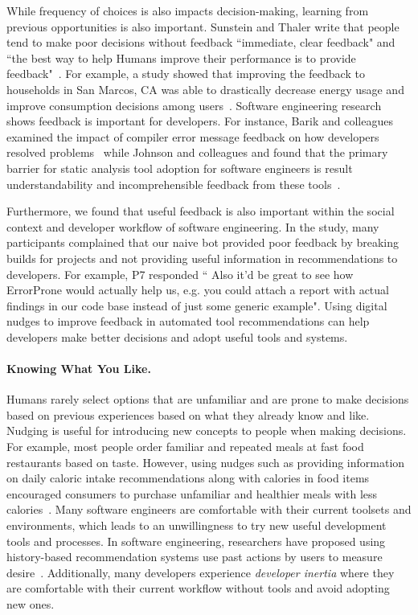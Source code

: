 While frequency of choices is also impacts decision-making, learning from previous opportunities is also important. Sunstein and Thaler write that people tend to make poor decisions without feedback ``immediate, clear feedback" and ``the best way to help Humans improve their performance is to provide feedback"~\cite[p.~77,~92]{sunstein2008nudge}. For example, a study showed that improving the feedback to households in San Marcos, CA was able to drastically decrease energy usage and improve consumption decisions among users~\cite{schultz2007constructive}. Software engineering research shows feedback is important for developers. For instance, Barik and colleagues examined the impact of compiler error message feedback on how developers resolved problems~\cite{barik2018should} while Johnson and colleagues and found that the primary barrier for static analysis tool adoption for software engineers is result understandability and incomprehensible feedback from these tools~\cite{Johnson2013Why}.

Furthermore, we found that useful feedback is also important within the social context and developer workflow of software engineering. In the \sorry study, many participants complained that our naive bot provided poor feedback by breaking builds for projects and not providing useful information in recommendations to developers. For example, P7 responded `` Also it'd be great to see how ErrorProne would actually help us, e.g. you could attach a report with actual findings in our code base instead of just some generic example". Using digital nudges to improve feedback in automated tool recommendations can help developers make better decisions and adopt useful tools and systems.

\paragraph{Knowing What You Like.} 

Humans rarely select options that are unfamiliar and are prone to make decisions based on previous experiences based on what they already know and like. Nudging is useful for introducing new concepts to people when making decisions. For example, most people order familiar and repeated meals at fast food restaurants based on taste. However, using nudges such as providing information on daily caloric intake recommendations along with calories in food items encouraged consumers to purchase unfamiliar and healthier meals with less calories~\cite{Wisdom2010Healthy}. Many software engineers are comfortable with their current toolsets and environments, which leads to an unwillingness to try new useful development tools and processes. In software engineering, researchers have proposed using history-based recommendation systems use past actions by users to measure desire~\cite{Murphy-Hill2012Fluency}. Additionally, many developers experience \textit{developer inertia} where they are comfortable with their current workflow without tools and avoid adopting new ones.  

